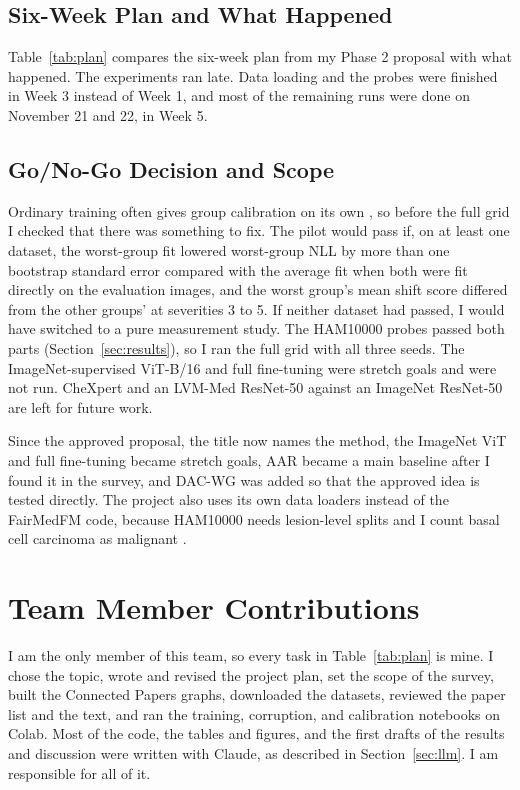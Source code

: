 \documentclass[sigconf,nonacm]{acmart}
\begin{document}
\subsection{Six-Week Plan and What Happened}

Table~\ref{tab:plan} compares the six-week plan from my Phase 2 proposal with what happened. The experiments ran late. Data loading and the probes were finished in Week 3 instead of Week 1, and most of the remaining runs were done on November 21 and 22, in Week 5.

\subsection{Go/No-Go Decision and Scope}
\label{sec:gonogo}

Ordinary training often gives group calibration on its own \cite{liu2019implicit}, so before the full grid I checked that there was something to fix. The pilot would pass if, on at least one dataset, the worst-group fit lowered worst-group NLL by more than one bootstrap standard error compared with the average fit when both were fit directly on the evaluation images, and the worst group's mean shift score differed from the other groups' at severities 3 to 5. If neither dataset had passed, I would have switched to a pure measurement study. The HAM10000 probes passed both parts (Section~\ref{sec:results}), so I ran the full grid with all three seeds. The ImageNet-supervised ViT-B/16 \cite{dosovitskiy2021vit} and full fine-tuning were stretch goals and were not run. CheXpert \cite{irvin2019chexpert} and an LVM-Med ResNet-50 against an ImageNet ResNet-50 \cite{nguyen2023lvmmed,he2016resnet} are left for future work.

Since the approved proposal, the title now names the method, the ImageNet ViT and full fine-tuning became stretch goals, AAR became a main baseline after I found it in the survey, and DAC-WG was added so that the approved idea is tested directly. The project also uses its own data loaders instead of the FairMedFM code, because HAM10000 needs lesion-level splits and I count basal cell carcinoma as malignant \cite{zong2023medfair}.

\section{Team Member Contributions}

I am the only member of this team, so every task in Table~\ref{tab:plan} is mine. I chose the topic, wrote and revised the project plan, set the scope of the survey, built the Connected Papers graphs, downloaded the datasets, reviewed the paper list and the text, and ran the training, corruption, and calibration notebooks on Colab. Most of the code, the tables and figures, and the first drafts of the results and discussion were written with Claude, as described in Section~\ref{sec:llm}. I am responsible for all of it.
\end{document}
